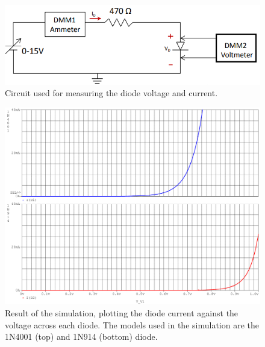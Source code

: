 \documentclass{report}
\begin{document}
\begin{figure}[H]
	\centering
	\includegraphics[width=0.7\linewidth]{exp1ckt}
	\caption{Circuit used for measuring the diode voltage and current.}
	\label{fig:exp1ckt}
\end{figure}

\begin{figure}[H]
	\centering
	\includegraphics[width=1.0\linewidth]{exp1simcombined}
	\caption{Result of the simulation, plotting the diode current against the voltage across each diode. The models used in the simulation are the 1N4001 (top) and 1N914 (bottom) diode.}
	\label{fig:exp1sim}
\end{figure}
\end{document}
